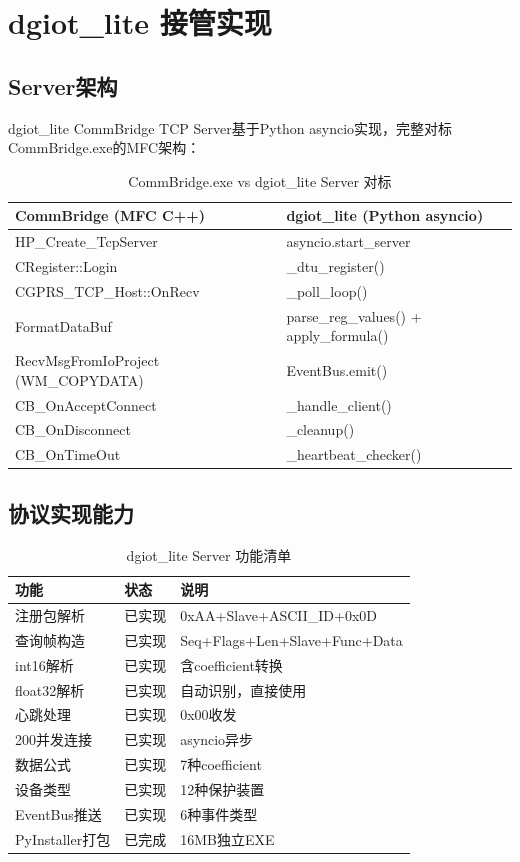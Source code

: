 \documentclass[12pt,a4paper]{ctexart}
\begin{document}
\section{dgiot\_lite 接管实现}

\subsection{Server架构}

dgiot\_lite CommBridge TCP Server基于Python asyncio实现，完整对标CommBridge.exe的MFC架构：

\begin{table}[H]\centering
\caption{CommBridge.exe vs dgiot\_lite Server 对标}
\begin{tabular}{p{4.5cm}p{4.5cm}}
\toprule
\textbf{CommBridge (MFC C++)} & \textbf{dgiot\_lite (Python asyncio)} \\
\midrule
HP\_Create\_TcpServer & asyncio.start\_server \\
CRegister::Login & \_dtu\_register() \\
CGPRS\_TCP\_Host::OnRecv & \_poll\_loop() \\
FormatDataBuf & parse\_reg\_values() + apply\_formula() \\
RecvMsgFromIoProject (WM\_COPYDATA) & EventBus.emit() \\
CB\_OnAcceptConnect & \_handle\_client() \\
CB\_OnDisconnect & \_cleanup() \\
CB\_OnTimeOut & \_heartbeat\_checker() \\
\bottomrule
\end{tabular}
\end{table}

\subsection{协议实现能力}

\begin{table}[H]\centering
\caption{dgiot\_lite Server 功能清单}
\begin{tabular}{p{3.5cm}p{2cm}p{5cm}}
\toprule
\textbf{功能} & \textbf{状态} & \textbf{说明} \\
\midrule
注册包解析 & 已实现 & 0xAA+Slave+ASCII\_ID+0x0D \\
查询帧构造 & 已实现 & Seq+Flags+Len+Slave+Func+Data \\
int16解析 & 已实现 & 含coefficient转换 \\
float32解析 & 已实现 & 自动识别，直接使用 \\
心跳处理 & 已实现 & 0x00收发 \\
200并发连接 & 已实现 & asyncio异步 \\
数据公式 & 已实现 & 7种coefficient \\
设备类型 & 已实现 & 12种保护装置 \\
EventBus推送 & 已实现 & 6种事件类型 \\
PyInstaller打包 & 已完成 & 16MB独立EXE \\
\bottomrule
\end{tabular}
\end{table}
\end{document}
